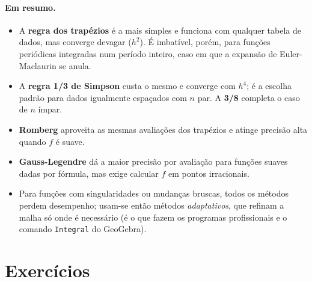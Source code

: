 \paragraph{Em resumo.}
\begin{itemize}[nosep]
  \item A \textbf{regra dos trapézios} é a mais simples e funciona com qualquer tabela de
        dados, mas converge devagar ($h^2$). É imbatível, porém, para funções periódicas
        integradas num período inteiro, caso em que a expansão de Euler-Maclaurin se anula.
  \item A \textbf{regra 1/3 de Simpson} custa o mesmo e converge com $h^4$; é a escolha padrão
        para dados igualmente espaçados com $n$ par. A \textbf{3/8} completa o caso de $n$ ímpar.
  \item \textbf{Romberg} aproveita as mesmas avaliações dos trapézios e atinge precisão alta
        quando $f$ é suave.
  \item \textbf{Gauss-Legendre} dá a maior precisão por avaliação para funções suaves dadas por
        fórmula, mas exige calcular $f$ em pontos irracionais.
  \item Para funções com singularidades ou mudanças bruscas, todos os métodos perdem
        desempenho; usam-se então métodos \emph{adaptativos}, que refinam a malha só onde é
        necessário (é o que fazem os programas profissionais e o comando \texttt{Integral} do
        GeoGebra).
\end{itemize}

\section{Exercícios}

